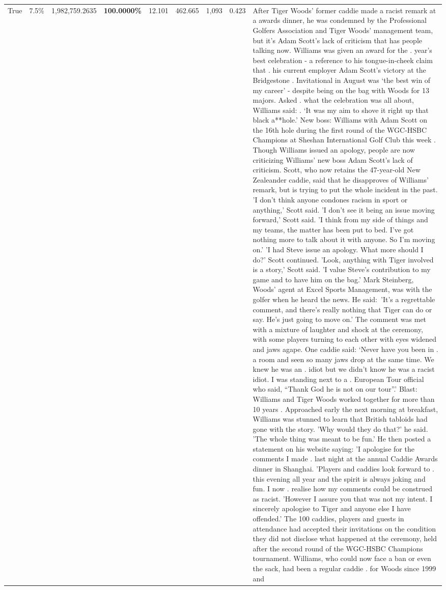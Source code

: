 \begin{table}[H]
\begin{tabular}{lllrlllll}
True & 7.5\% & 1,982,759.2635 & \bfseries \color{red} 100.0000\% & 12.101 & 462.665 & 1,093 & 0.423 & After Tiger Woods' former caddie made a racist remark at a awards dinner, he was condemned by the Professional Golfers Association and Tiger Woods' management team, but it's Adam Scott's lack of criticism that has people talking now. Williams was given an award for the . year’s best celebration - a reference to his tongue-in-cheek claim that . his current employer Adam Scott’s victory at the Bridgestone . Invitational in August was ‘the best win of my career’ - despite being on the bag with Woods for 13 majors. Asked . what the celebration was all about, Williams said: . ‘It was my aim to shove it right up that black a**hole.’ New boss: Williams with Adam Scott  on the 16th hole during the first round of the WGC-HSBC Champions at Sheshan International Golf Club this week . Though Williams issued an apology, people are now criticizing Williams' new boss Adam Scott's lack of criticism. Scott, who now retains the 47-year-old New Zealeander caddie, said that he disapproves of Williams' remark, but is trying to put the whole incident in the past. 'I don't think anyone condones racism in sport or anything,' Scott said. 'I don't see it being an issue moving forward,' Scott said. 'I think from my side of things and my teams, the matter has been put to bed. I've got nothing more to talk about it with anyone. So I'm moving on.' 'I had Steve issue an apology. What more should I do?' Scott continued. 'Look, anything with Tiger involved is a story,' Scott said. 'I value Steve's contribution to my game and to have him on the bag.' Mark Steinberg, Woods' agent at Excel Sports Management, was with the golfer when he heard the news. He said: 'It's a regrettable comment, and there's really nothing that Tiger can do or say. He's just going to move on.' The comment was met with a mixture of laughter and shock at the ceremony, with some players turning to each other with eyes widened and jaws agape. One caddie said: ‘Never have you been in . a room and seen so many jaws drop at the same time. We knew he was an . idiot but we didn’t know he was a racist idiot. I was standing next to a . European Tour official who said, “Thank God he is not on our tour”.’ Blast: Williams and Tiger Woods worked together for more than 10 years . Approached early the next morning at breakfast, Williams was stunned to learn that British tabloids had gone with the story. 'Why would they do that?' he said. 'The whole thing was meant to be fun.' He then posted a statement on his website saying: 'I apologise for the comments I made . last night at the annual Caddie Awards dinner in Shanghai. 'Players and caddies look forward to . this evening all year and the spirit is always joking and fun. I now . realise how my comments could be construed as racist. 'However I assure you that was not my intent. I sincerely apologise to Tiger and anyone else I have offended.' The 100 caddies, players and guests in attendance had accepted their invitations on the condition they did not disclose what happened at the ceremony, held after the second round of the WGC-HSBC Champions tournament. Williams, who could now face a ban or even the sack, had been a regular caddie . for Woods since 1999 and 
\end{tabular}
\end{table}
